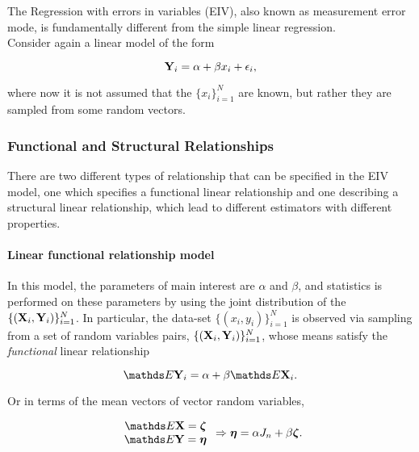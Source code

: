 \documentclass{homework}
\begin{document}
The Regression with errors in variables (EIV), also known as measurement error mode, is fundamentally different from the simple linear regression. \\

Consider again a linear model of the form 

\begin{equation}
    {\bf Y}_i = \alpha + \beta x_i + \epsilon_i,
\end{equation}

where now it is not assumed that the $\{x_i\}_{i=1}^{N}$ are known, but rather they are sampled from some random vectors. 

\subsubsection{Functional and Structural Relationships}

There are two different types of relationship that can be specified in the EIV model, one which specifies a functional linear relationship and one describing a structural linear relationship, which lead to different estimators with different properties. \\

\paragraph{\textbf{Linear functional relationship model}}

In this model, the parameters of main interest are $\alpha$ and $\beta$, and statistics is performed on these parameters by using the joint distribution of the $\{({\bf X}_i, {\bf Y}_i)\}_{i=1}^{N}$. In particular, the data-set $\{(x_i, y_i)\}_{i=1}^{N}$ is observed via sampling from a set of random variables pairs, $\{({\bf X}_i, {\bf Y}_i)\}_{i=1}^{N}$, whose means satisfy the \textit{functional} linear relationship

\begin{equation}
    \E \Y_i = \alpha + \beta \E \X_i.
\end{equation}

Or in terms of the mean vectors of vector random variables, 

\begin{equation}
    \begin{array}{c}
         \E \X = \bm{\zeta} \\
         \E \Y = \bm{\eta}
    \end{array} \Rightarrow \bm{\eta} = \alpha J_n + \beta \bm{\zeta}.
    \label{functional EIV-model}
\end{equation}
\end{document}
